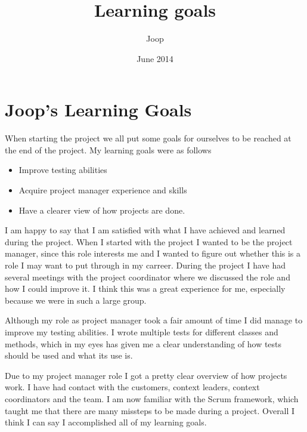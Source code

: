 \documentclass{article}
\title{Learning goals}
\author{Joop}
\date{June 2014}
\begin{document}
\maketitle

\section*{Joop's Learning Goals}
When starting the project we all put some goals for ourselves to be reached at the end of the project. 
My learning goals were as follows
\begin{itemize}
	\item Improve testing abilities
	\item Acquire project manager experience and skills
	\item Have a clearer view of how projects are done.
\end{itemize}

I am happy to say that I am satisfied with what I have achieved and learned during the project. When I started with the project I wanted to be the project manager, since this role interests me and I wanted to figure out whether this is a role I may want to put through in my carreer. During the project I have had several meetings with the project coordinator where we discussed the role and how I could improve it. I think this was a great experience for me, especially because we were in such a large group.

Although my role as project manager took a fair amount of time I did manage to improve my testing abilities. I wrote multiple tests for different classes and methods, which in my eyes has given me a clear understanding of how tests should be used and what its use is.

Due to my project manager role I got a pretty clear overview of how projects work. I have had contact with the customers, context leaders, context coordinators and the team. I am now familiar with the Scrum framework, which taught me that there are many missteps to be made during a project.
Overall I think I can say I accomplished all of my learning goals.
\end{document}
